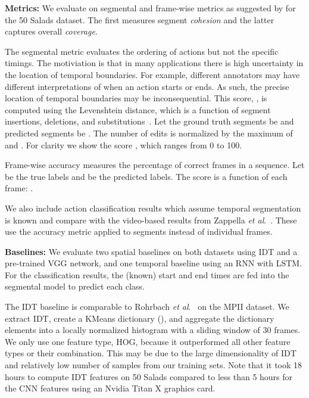 \documentclass[runningheads]{llncs}
\newcommand{\fakesubsection}[1]{\smallskip\noindent\textbf{#1:}}
\newcommand{\etal}{\emph{et al}.}
\begin{document}
\fakesubsection{Metrics}
We evaluate on segmental and frame-wise metrics as suggested by \cite{lea_icra_2016} for the 50 Salads dataset. The first measures segment \textit{cohesion} and the latter captures overall \textit{coverage}. 


The segmental metric evaluates the ordering of actions but not the specific timings. The motiviation is that in many applications there is high uncertainty in the location of temporal boundaries. For example, different annotators may have different interpretations of when an action starts or ends. 
As such, the precise location of temporal boundaries may be inconsequential. 
This score, , is computed using the Levenshtein distance, which is a function of segment insertions, deletions, and substitutions~\cite{Navarro_2001}. Let the ground truth segments be  and predicted segments be . The number of edits is normalized by the maximum of  and . For clarity we show the score , which ranges from 0 to 100. 

Frame-wise accuracy measures the percentage of correct frames in a sequence. 
Let  be the true labels and  be the predicted labels. The score is a function of each frame: . 

We also include action classification results which assume temporal segmentation is known and compare with the video-based results from Zappella \etal~\cite{zappella_media_2013}. These use the accuracy metric applied to segments instead of individual frames. 











\fakesubsection{Baselines} We evaluate two spatial baselines on both datasets using IDT and a pre-trained VGG network, and one temporal baseline using an RNN with LSTM. 
For the classification results, the (known) start and end times are fed into the segmental model to predict each class.


The IDT baseline is comparable to Rohrbach \etal~\cite{rohrbach_ijcv_2015} on the MPII dataset. We extract IDT, create a KMeans dictionary (), and aggregate the dictionary elements into a locally normalized histogram with a sliding window of 30 frames. 
We only use one feature type, HOG, because it outperformed all other feature types or their combination.
This may be due to the large dimensionality of IDT and relatively low number of samples from our training sets. 
Note that it took 18 hours to compute IDT features on 50 Salads compared to less than 5 hours for the CNN features using an Nvidia Titan X graphics card.
\end{document}
